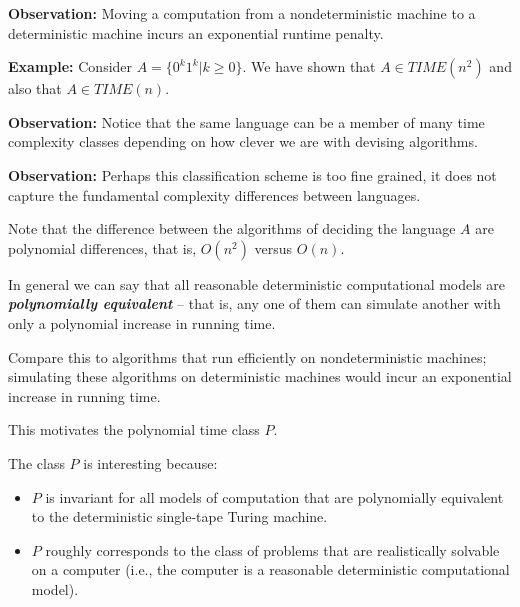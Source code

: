 \documentclass[a4paper,blends,pdf,colorBG,slideColor]{prosper}
\begin{document}
{\bf Observation:} Moving a computation from a nondeterministic machine to a deterministic machine incurs an exponential runtime penalty.
\es


{\bf Example:} Consider $A=\{0^k 1^k | k \ge 0\}$.  We have shown that $A \in TIME(n^2)$ and also
that $A \in TIME(n)$.

{\bf Observation:} Notice that the same language can be a member of many time complexity classes depending on how clever we are with devising algorithms.

{\bf Observation:} Perhaps this classification scheme is too fine grained, it does not capture the fundamental complexity differences between languages.
\es

Note that the difference between the algorithms of deciding the language $A$ are polynomial differences, that is, $O(n^2)$ versus $O(n)$.

In general we can say that all reasonable deterministic  computational models are {\bf\em polynomially equivalent} -- that is, any one of them can simulate another with only a polynomial increase in running time.

Compare this to algorithms that run efficiently on nondeterministic machines; simulating these algorithms on deterministic machines would incur an exponential increase in running time.

This motivates the polynomial time class $P$.

\es


The class $P$ is interesting because:
\begin{itemize}
\item $P$ is invariant for all models of computation that are polynomially equivalent to the deterministic single-tape Turing machine.
\item $P$ roughly corresponds to the class of problems that are realistically solvable on a computer (i.e., the computer is a reasonable deterministic computational model).
\end{itemize}
\end{document}
